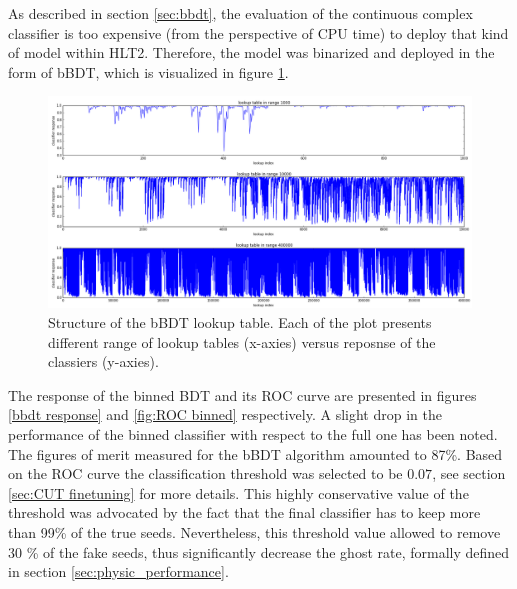 As described in section \ref{sec:bbdt}, the evaluation of the continuous complex classifier is too expensive (from the perspective of CPU time) to deploy that kind of model within HLT2. Therefore, the model was binarized and deployed in the form of bBDT, which is visualized in figure \ref{fig:bbt_structure}. 



\begin{figure}[h]
\centering
\hspace*{-1cm}\includegraphics{figures/BBDT_lookup.png}
\caption{Structure of the bBDT lookup table. Each of the plot presents different range of lookup tables (x-axies) versus reposnse of the classiers (y-axies).}
\label{fig:bbt_structure}
\end{figure}



The response of the binned BDT and its ROC curve are presented in figures  \ref{bbdt response} and \ref{fig:ROC binned} respectively. A slight drop in the performance of the binned classifier with respect to the full one has been noted. The figures of merit measured for the bBDT algorithm amounted to 87\%. Based on the ROC curve the classification threshold was selected to be $0.07$, see section \ref{sec:CUT finetuning} for more details. This highly conservative value of the threshold was advocated by the fact that the final classifier has to keep more than 99\% of the true seeds. Nevertheless, this threshold value allowed to remove 30 \% of the fake seeds, thus significantly decrease the ghost rate, formally defined in section \ref{sec:physic_performance}.   



